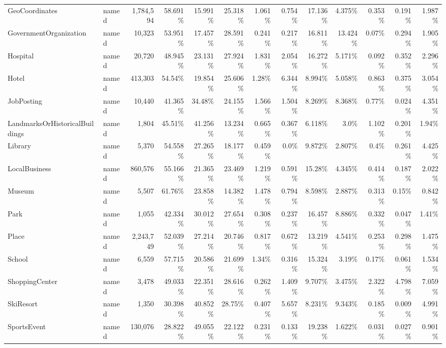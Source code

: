 \begin{table}[t]
{\begin{tabular}{llrrrrrrrrrrr}
GeoCoordinates & named & 1{,}784{,}594 & 58.691\% & 15.991\% & 25.318\% & 1.061\% & 0.754\% & 17.136\% & 4.375\% & 0.353\% & 0.191\% & 1.987\% \\
GovernmentOrganization & named & 10{,}323 & 53.951\% & 17.457\% & 28.591\% & 0.241\% & 0.217\% & 16.811\% & 13.424\% & 0.07\% & 0.294\% & 1.905\% \\
Hospital & named & 20{,}720 & 48.945\% & 23.131\% & 27.924\% & 1.831\% & 2.054\% & 16.272\% & 5.171\% & 0.092\% & 0.352\% & 2.296\% \\
Hotel & named & 413{,}303 & 54.54\% & 19.854\% & 25.606\% & 1.28\% & 6.344\% & 8.994\% & 5.058\% & 0.863\% & 0.375\% & 3.054\% \\
JobPosting & named & 10{,}440 & 41.365\% & 34.48\% & 24.155\% & 1.566\% & 1.504\% & 8.269\% & 8.368\% & 0.77\% & 0.024\% & 4.351\% \\
LandmarksOrHistoricalBuildings & named & 1{,}804 & 45.51\% & 41.256\% & 13.234\% & 0.665\% & 0.367\% & 6.118\% & 3.0\% & 1.102\% & 0.201\% & 1.94\% \\
Library & named & 5{,}370 & 54.558\% & 27.265\% & 18.177\% & 0.459\% & 0.0\% & 9.872\% & 2.807\% & 0.4\% & 0.261\% & 4.425\% \\
LocalBusiness & named & 860{,}576 & 55.166\% & 21.365\% & 23.469\% & 1.219\% & 0.591\% & 15.28\% & 4.345\% & 0.414\% & 0.187\% & 2.022\% \\
Museum & named & 5{,}507 & 61.76\% & 23.858\% & 14.382\% & 1.478\% & 0.794\% & 8.598\% & 2.887\% & 0.313\% & 0.15\% & 0.842\% \\
Park & named & 1{,}055 & 42.334\% & 30.012\% & 27.654\% & 0.308\% & 0.237\% & 16.457\% & 8.886\% & 0.332\% & 0.047\% & 1.41\% \\
Place & named & 2{,}243{,}749 & 52.039\% & 27.214\% & 20.746\% & 0.817\% & 0.672\% & 13.219\% & 4.541\% & 0.253\% & 0.298\% & 1.475\% \\
School & named & 6{,}559 & 57.715\% & 20.586\% & 21.699\% & 1.34\% & 0.316\% & 15.324\% & 3.19\% & 0.17\% & 0.061\% & 1.534\% \\
ShoppingCenter & named & 3{,}478 & 49.033\% & 22.351\% & 28.616\% & 0.262\% & 1.409\% & 9.707\% & 3.475\% & 2.322\% & 4.798\% & 7.059\% \\
SkiResort & named & 1{,}350 & 30.398\% & 40.852\% & 28.75\% & 0.407\% & 5.657\% & 8.231\% & 9.343\% & 0.185\% & 0.009\% & 4.991\% \\
SportsEvent & named & 130{,}076 & 28.822\% & 49.055\% & 22.122\% & 0.231\% & 0.133\% & 19.238\% & 1.622\% & 0.031\% & 0.027\% & 0.901\% \\

\end{tabular}}
\end{table}
